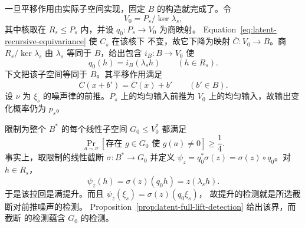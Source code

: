 一旦平移作用由实际子空间实现，固定 $B$ 的构造就完成了。令
\[
 V_0=P_s/\ker\lambda_s,
\]
其中核取在 $R_s\le P_s$ 内，并设 $q_0:P_s\to V_0$ 为商映射。
Equation~\eqref{eq:latent-recursive-equivariance} 使 $C_s$ 在该核下
不变，故它下降为映射 $\overline C:V_0\to B$。商
$R_s/\ker\lambda_s$ 由 $\lambda_s$ 等同于 $B$，给出包含
$i_B:B\to V_0$ 使
\[
 q_0(h)=i_B(\lambda_s h)\qquad(h\in R_s).
\]
下文把该子空间等同于 $B$。其平移作用满足
\[
 \overline C(x+b')=\overline C(x)+b'
 \qquad(b'\in B).
\]
设 $\nu$ 为 $\xi_s$ 的噪声律的前推。$P_s$ 上的均匀输入前推为
$V_0$ 上的均匀输入，故输出变化概率仍为 $p_s$。

限制为整个 $B^*$ 的每个线性子空间 $G_0\le V_0^*$ 都满足
\begin{equation}\label{eq:latent-base-detection}
 \Pr_{a\sim\nu}[\text{存在 }g\in G_0\text{ 使 }g(a)\ne0]
 \ge\frac14.
\end{equation}
事实上，取限制的线性截断 $\sigma:B^*\to G_0$ 并定义
$\psi_z=q_0^*\sigma(z)=\sigma(z)\circ q_0$。对 $h\in R_s$，
\[
 \psi_z(h)=\sigma(z)(q_0h)=z(\lambda_s h).
\]
于是该拉回是满提升。而且 $\psi_z(\xi_s)=\sigma(z)(q_0\xi_s)$，
故提升的检测就是所选截断对前推噪声的检测。
Proposition~\ref{prop:latent-full-lift-detection} 给出该界，而截断
的检测蕴含 $G_0$ 的检测。

